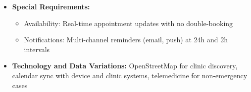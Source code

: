 \begin{itemize}
    \begin{itemize}
        \item 2a. No nearby clinics: System expands search or suggests telemedicine
        \item 5a. Veterinarian declines or no slots: System suggests alternatives
        \item 7a. User reschedules or cancels: System allows changes with 4-hour notice
    \end{itemize}
    \item \textbf{Special Requirements:}
    \begin{itemize}
        \item Availability: Real-time appointment updates with no double-booking
        \item Notifications: Multi-channel reminders (email, push) at 24h and 2h intervals
    \end{itemize}
    \item \textbf{Technology and Data Variations:} OpenStreetMap for clinic discovery, calendar sync with device and clinic systems, telemedicine for non-emergency cases
\end{itemize}


